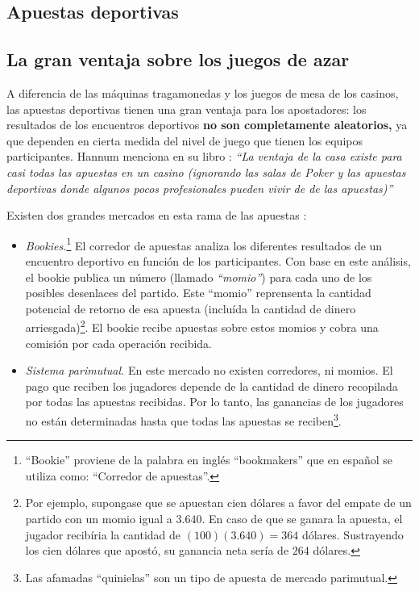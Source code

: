 \subsection{Apuestas deportivas}

\subsection{La gran ventaja sobre los juegos de azar}

A diferencia de las máquinas tragamonedas y los juegos de mesa de los casinos, las apuestas deportivas tienen una gran ventaja para los apostadores: los resultados de los encuentros deportivos \textbf{no son completamente aleatorios,} ya que dependen en cierta medida del nivel de juego que tienen los equipos participantes. Hannum menciona en su libro \cite{hannum2005practical} : \emph{``La ventaja de la casa existe para casi todas las apuestas en un casino (ignorando las salas de Poker y las apuestas deportivas donde algunos pocos profesionales pueden vivir de de las apuestas)''}

Existen dos grandes mercados en esta rama de las apuestas \cite{chung2010empirical}:
\begin{itemize} 
	\item \emph{Bookies.}\footnote{``Bookie'' proviene de la palabra en inglés ``bookmakers'' que en español se utiliza como: ``Corredor de apuestas''.} El corredor de apuestas analiza los diferentes resultados de un encuentro deportivo en función de los participantes. Con base en este análisis, el bookie publica un número (llamado \emph{``momio''}) para cada uno de los posibles desenlaces del partido. Este ``momio'' reprensenta la cantidad potencial de retorno de esa apuesta (incluída la cantidad de dinero arriesgada)\footnote{Por ejemplo, supongase que se apuestan cien dólares a favor del empate de un partido con un momio igual a $3.640$. En caso de que se ganara la apuesta, el jugador recibíria la cantidad de $(100)(3.640) = 364$ dólares. Sustrayendo los cien dólares que apostó, su ganancia neta sería de $264$ dólares.}. El bookie recibe apuestas sobre estos momios y cobra una comisión por cada operación recibida. 
	\item \emph{Sistema parimutual.} En este mercado no existen  corredores, ni momios. El pago que reciben los jugadores depende de la cantidad de dinero recopilada por todas las apuestas recibidas. Por lo tanto, las ganancias de los jugadores no están determinadas hasta que todas las apuestas se reciben\footnote{Las afamadas ``quinielas'' son un tipo de apuesta de mercado parimutual.}.
	\end{itemize}

